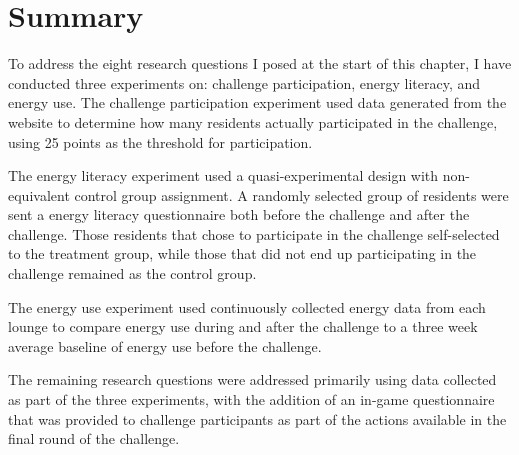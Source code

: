 \section{Summary}

To address the eight research questions I posed at the start of this chapter, I have conducted three experiments on: challenge participation, energy literacy, and energy use. The challenge participation experiment used data generated from the website to determine how many residents actually participated in the challenge, using 25 points as the threshold for participation.

The energy literacy experiment used a quasi-experimental design with non-equivalent control group assignment. A randomly selected group of residents were sent a energy literacy questionnaire both before the challenge and after the challenge. Those residents that chose to participate in the challenge self-selected to the treatment group, while those that did not end up participating in the challenge remained as the control group.

The energy use experiment used continuously collected energy data from each lounge to compare energy use during and after the challenge to a three week average baseline of energy use before the challenge.

The remaining research questions were addressed primarily using data collected as part of the three experiments, with the addition of an in-game questionnaire that was provided to challenge participants as part of the actions available in the final round of the challenge.
